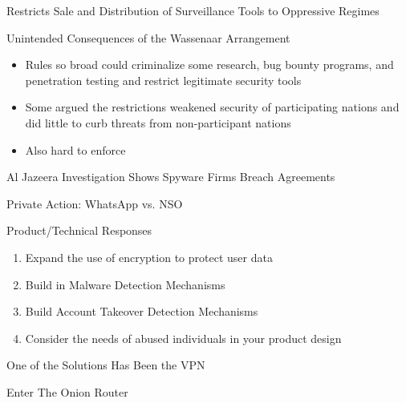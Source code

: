 \documentclass[nobackground,dvipsnames,table]{beamer}
\begin{document}
\begin{frame}{Restricts Sale and Distribution of Surveillance Tools to Oppressive Regimes}
\end{frame}

\begin{frame}{Unintended Consequences of the Wassenaar Arrangement}
    \begin{itemize}
        \item Rules so broad could criminalize some research, bug bounty programs, and penetration testing and restrict legitimate security tools 
        \item Some argued the restrictions weakened security of participating nations and did little to curb threats from non-participant nations
        \item Also hard to enforce 
    \end{itemize}
\end{frame}

\begin{frame}{Al Jazeera Investigation Shows Spyware Firms Breach Agreements}
\end{frame}

\begin{frame}{Private Action: WhatsApp vs. NSO }
\end{frame}

\begin{frame}{Product/Technical Responses}
    \begin{enumerate}
        \item Expand the use of encryption to protect user data
        \item Build in Malware Detection Mechanisms
        \item Build Account Takeover Detection Mechanisms
        \item Consider the needs of abused individuals in your product design
    \end{enumerate}
\end{frame}

\begin{frame}{One of the Solutions Has Been the VPN}
    
\end{frame}

\begin{frame}{Enter The Onion Router}
    
\end{frame}
\end{document}
